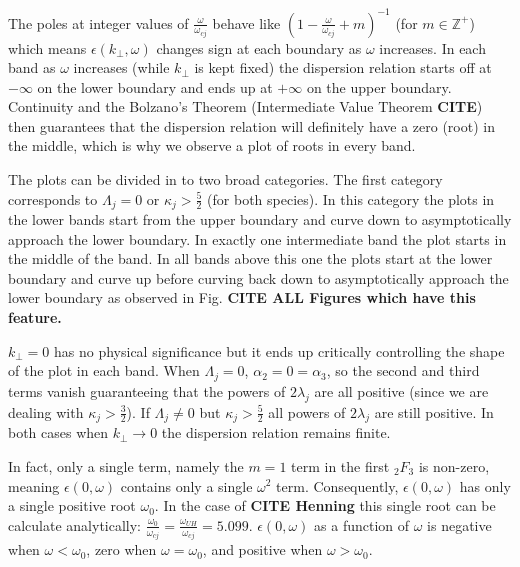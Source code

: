 \documentclass[12pt,a4paper]{article}
\begin{document}
    The poles at integer values of $\frac{\omega}{\omega_{cj}}$ behave like $(1 - \frac{\omega}{\omega_{cj}} + m)^{-1}$ (for $m \in \mathbb{Z}^+$) which means $\epsilon(k_\perp, \omega)$ changes sign at each boundary as $\omega$ increases.
    In each band as $\omega$ increases (while $k_\perp$ is kept fixed) the dispersion relation starts off at $-\infty$ on the lower boundary and ends up at $+\infty$ on the upper boundary.
    Continuity and the Bolzano's Theorem (Intermediate Value Theorem \textbf{CITE}) then guarantees that the dispersion relation will definitely have a zero (root) in the middle, which is why we observe a plot of roots in every band.

    The plots can be divided in to two broad categories.
    The first category corresponds to $\Lambda_j = 0$ or $\kappa_j > \frac{5}{2}$ (for both species).
    In this category the plots in the lower bands start from the upper boundary and curve down to asymptotically approach the lower boundary.
    In exactly one intermediate band the plot starts in the middle of the band.
    In all bands above this one the plots start at the lower boundary and curve up before curving back down to asymptotically approach the lower boundary as observed in Fig. \textbf{CITE ALL Figures which have this feature.}


    $k_\perp = 0$ has no physical significance but it ends up critically controlling the shape of the plot in each band.
    When $\Lambda_j = 0$, $\alpha_2 = 0 = \alpha_3$, so the second and third terms vanish guaranteeing that the powers of $2 \lambda_j$ are all positive (since we are dealing with $\kappa_j > \frac{3}{2}$).
    If $\Lambda_j \neq 0$ but $\kappa_j > \frac{5}{2}$ all powers of $2 \lambda_j$ are still positive.
    In both cases when $k_\perp \rightarrow 0$ the dispersion relation remains finite.

    In fact, only a single term, namely the $m = 1$ term in the first $_2F_3$ is non-zero, meaning $\epsilon(0, \omega)$ contains only a single $\omega^2$ term.
    Consequently, $\epsilon(0, \omega)$ has only a single positive root $\omega_0$.
    In the case of \textbf{CITE Henning} this single root can be calculate analytically: $\frac{\omega_0}{\omega_{cj}} = \frac{\omega_{UH}}{\omega_{cj}} = 5.099$.
    $\epsilon(0, \omega)$ as a function of $\omega$ is negative when $\omega < \omega_0$, zero when $\omega = \omega_0$, and positive when $\omega > \omega_0$.
\end{document}
